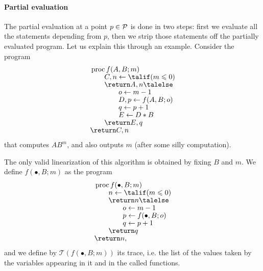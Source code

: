 \paragraph{Partial evaluation}
\label{sec:partial-evaluation}
The partial evaluation at a point $p\in\mathcal{P}$ is done in two steps:
first we evaluate all the statements depending from $p$, then we strip
those statements off the partially evaluated program. Let us explain
this through an example. Consider the program
\begin{equation}
  \label{eq:77}
  \begin{aligned}
    &\proc f(A,B;m)\\[-1ex]
    &\qquad C,n \la \talif (m\le 0)\\[-1ex]
    &\qquad \return A,n \talelse\\[-1ex]
    &\qquad\qquad o\la m-1\\[-1ex]
    &\qquad\qquad D,p \la f(A,B;o)\\[-1ex]
    &\qquad\qquad q\la p + 1\\[-1ex]
    &\qquad\qquad E \la D * B\\[-1ex]
    &\qquad \return E,q\\[-1ex] &\return C,n
  \end{aligned}
\end{equation}
that computes $AB^m$, and also outputs $m$ (after some silly
computation).

The only valid linearization of this algorithm is obtained by fixing
$B$ and $m$. We define $f(\bullet,B;m)$ as the program
\begin{equation}
  \begin{aligned}
   &\proc f(\bullet,B;m)\\[-1ex]
   &\qquad n \la \talif (m \le 0)\\[-1ex]
   &\qquad \return n \talelse\\[-1ex]
   &\qquad\qquad o \la m-1\\[-1ex]
   &\qquad\qquad p \la f(\bullet,B;o)\\[-1ex]
   &\qquad\qquad q \la p + 1\\[-1ex]
   &\qquad \return q\\[-1ex]
   &\return n
   \text{,}
  \end{aligned}
\end{equation}
and we define by $\mathcal{T}(f(\bullet,B;m))$ its trace, i.e. the
list of the values taken by the variables appearing in it and in the
called functions.

